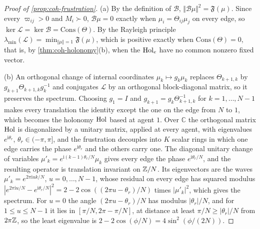 \begin{proof}[Proof of \cref{prop:coh-frustration}]
(a) By the definition of $\mathcal B$, $\Vert\mathcal B\mu\Vert^2=\mathfrak F(\mu)$. Since every $\varpi_{ij}>0$ and $M_i\succ0$, $\mathcal B\mu=0$ exactly when $\mu_i=\Theta_{ij}\mu_j$ on every edge, so $\ker\mathcal L=\ker\mathcal B=\mathrm{Cons}(\Theta)$. By the Rayleigh principle $\lambda_{\min}(\mathcal L)=\min_{\Vert\mu\Vert=1}\mathfrak F(\mu)$, which is positive exactly when $\mathrm{Cons}(\Theta)=0$, that is, by \cref{thm:coh-holonomy}(b), when the $\operatorname{Hol}_e$ have no common nonzero fixed vector.

(b) An orthogonal change of internal coordinates $\mu_k\mapsto g_k\mu_k$ replaces $\Theta_{k+1,k}$ by $g_{k+1}\Theta_{k+1,k}g_k^{-1}$ and conjugates $\mathcal L$ by an orthogonal block-diagonal matrix, so it preserves the spectrum. Choosing $g_1=I$ and $g_{k+1}=g_k\Theta_{k+1,k}^{-1}$ for $k=1,\dots,N-1$ makes every translation the identity except the one on the edge from $N$ to $1$, which becomes the holonomy $\operatorname{Hol}$ based at agent $1$. Over $\mathbb C$ the orthogonal matrix $\operatorname{Hol}$ is diagonalized by a unitary matrix, applied at every agent, with eigenvalues $e^{\mathrm i\theta_r}$, $\theta_r\in(-\pi,\pi]$, and the frustration decouples into $K$ scalar rings in which one edge carries the phase $e^{\mathrm i\theta_r}$ and the others carry one. The diagonal unitary change of variables $\mu'_k=e^{\mathrm i(k-1)\theta_r/N}\mu_k$ gives every edge the phase $e^{\mathrm i\theta_r/N}$, and the resulting operator is translation invariant on $\mathbb{Z}/N$. Its eigenvectors are the waves $\mu'_k=e^{2\pi\mathrm iuk/N}$, $u=0,\dots,N-1$, whose residual on every edge has squared modulus $|e^{2\pi\mathrm iu/N}-e^{\mathrm i\theta_r/N}|^2=2-2\cos((2\pi u-\theta_r)/N)$ times $|\mu'_k|^2$, which gives the spectrum. For $u=0$ the angle $(2\pi u-\theta_r)/N$ has modulus $|\theta_r|/N$, and for $1\le u\le N-1$ it lies in $[\pi/N,2\pi-\pi/N]$, at distance at least $\pi/N\ge|\theta_r|/N$ from $2\pi\mathbb{Z}$, so the least eigenvalue is $2-2\cos(\phi/N)=4\sin^2(\phi/(2N))$.


\end{proof}
